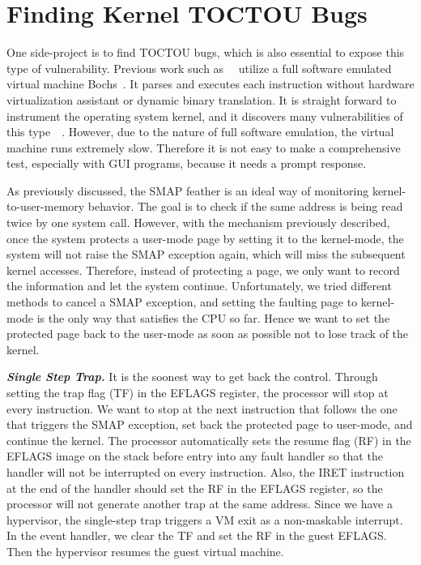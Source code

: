 \section{Finding Kernel TOCTOU Bugs}
\label{sec:experiment}
One side-project is to find TOCTOU bugs, which is also essential to expose this type of vulnerability.  Previous work such as~\cite{jurczyk2013identifying}~\cite{bochspwnreloaded} utilize a full software emulated virtual machine Bochs~\cite{lawton2003bochs}. It parses and executes each instruction without hardware virtualization assistant or dynamic binary translation.  It is straight forward to instrument the operating system kernel, and it discovers many vulnerabilities of this type~\cite{jurczyk2013identifying}~\cite{bochspwnreloaded}. However, due to the nature of full software emulation, the virtual machine runs extremely slow. Therefore it is not easy to make a comprehensive test, especially with GUI programs, because it needs a prompt response.

As previously discussed, the SMAP feather is an ideal way of monitoring kernel-to-user-memory behavior. The goal is to check if the same address is being read twice by one system call. However, with the mechanism previously described, once the system protects a user-mode page by setting it to the kernel-mode, the system will not raise the SMAP exception again, which will miss the subsequent kernel accesses. Therefore, instead of protecting a page, we only want to record the information and let the system continue. Unfortunately, we tried different methods to cancel a SMAP exception, and setting the faulting page to kernel-mode is the only way that satisfies the CPU so far. Hence we want to set the protected page back to the user-mode as soon as possible not to lose track of the kernel. 

\textbf{\textit{Single Step Trap.}} It is the soonest way to get back the control. Through setting the trap flag (TF) in the EFLAGS register, the processor will stop at every instruction. We want to stop at the next instruction that follows the one that triggers the SMAP exception, set back the protected page to user-mode, and continue the kernel. The processor automatically sets the resume flag (RF) in the EFLAGS image on the stack before entry into any fault handler so that the handler will not be interrupted on every instruction. Also, the IRET instruction at the end of the handler should set the RF in the EFLAGS register, so the processor will not generate another trap at the same address. Since we have a hypervisor, the single-step trap triggers a VM exit as a non-maskable interrupt. In the event handler, we clear the TF and set the RF in the guest EFLAGS. Then the hypervisor resumes the guest virtual machine.

